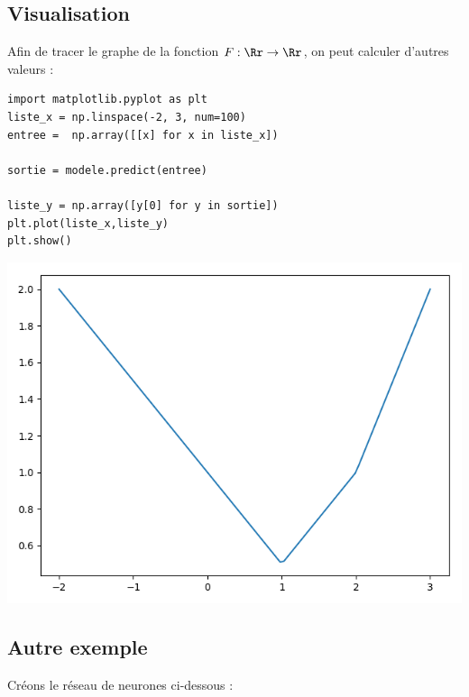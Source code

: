 \documentclass[11pt,class=report,crop=false]{standalone}
\begin{document}
\subsection{Visualisation}
Afin de tracer le graphe de la fonction $F: \Rr \to \Rr$, on peut calculer d'autres valeurs :

\begin{minipage}{0.55\textwidth}
\begin{lstlisting}
import matplotlib.pyplot as plt
liste_x = np.linspace(-2, 3, num=100)
entree =  np.array([[x] for x in liste_x])

sortie = modele.predict(entree)

liste_y = np.array([y[0] for y in sortie])
plt.plot(liste_x,liste_y)
plt.show()
\end{lstlisting}
\end{minipage}
\begin{minipage}{0.4\textwidth}
\begin{center}
\includegraphics[scale=\myscale,scale=0.4]{figures/pythontf-keras-01}
\end{center}
\end{minipage}

\subsection{Autre exemple}

Créons le réseau de neurones ci-dessous :

\end{document}
